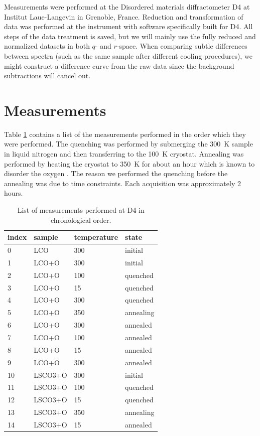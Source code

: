 \noindent Measurements were performed at the Disordered materials diffractometer D4 at Institut Laue-Langevin in Grenoble, France. Reduction and transformation of data was performed at the instrument with software specifically built for D4. All steps of the data treatment is saved, but we will mainly use the fully reduced and normalized datasets in both $q$- and $r$-space. When comparing subtle differences between spectra (such as the same sample after different cooling procedures), we might construct a difference curve from the raw data since the background subtractions will cancel out.

\section{Measurements}
Table \ref{tab:measurments} contains a list of the measurements performed in the order which they were performed. The quenching was performed by submerging the \SI{300}{\kelvin} sample in liquid nitrogen and then transferring to the \SI{100}{\kelvin} cryostat. Annealing was performed by heating the cryostat to \SI{350}{\kelvin} for about an hour which is known to disorder the oxygen \cite{Poccia2012}. The reason we performed the quenching before the annealing was due to time constraints. Each acquisition was approximately 2 hours.

\begin{table}
    \centering
    \begin{tabular}{llll}
        \toprule
        index &   sample & temperature &      state \\
        \midrule
        0  &      LCO &         300 &    initial \\
        1  &    LCO+O &         300 &    initial \\
        2  &    LCO+O &         100 &   quenched \\
        3  &    LCO+O &          15 &   quenched \\
        4  &    LCO+O &         300 &   quenched \\
        5  &    LCO+O &         350 &  annealing \\
        6  &    LCO+O &         300 &   annealed \\
        7  &    LCO+O &         100 &   annealed \\
        8  &    LCO+O &          15 &   annealed \\
        9  &    LCO+O &         300 &   annealed \\
        10 &  LSCO3+O &         300 &    initial \\
        11 &  LSCO3+O &         100 &   quenched \\
        12 &  LSCO3+O &          15 &   quenched \\
        13 &  LSCO3+O &         350 &  annealing \\
        14 &  LSCO3+O &          15 &   annealed \\
        \bottomrule
    \end{tabular}
    \caption{List of measurements performed at D4 in chronological order.}
    \label{tab:measurments}
\end{table}

